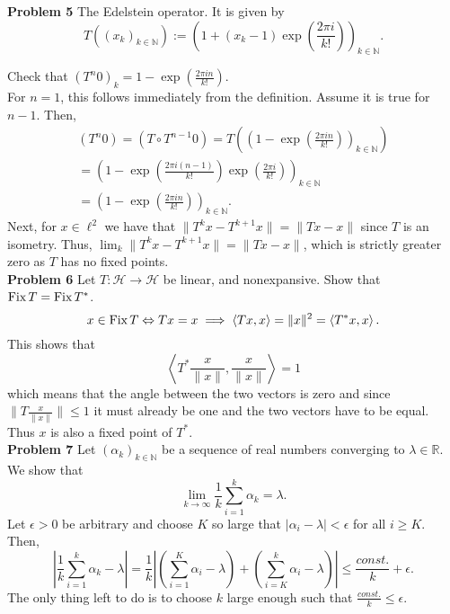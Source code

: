 \documentclass{scrartcl}
\newcommand{\N}{\mathbb{N}}
\newcommand{\R}{\mathbb{R}}
\renewcommand{\H}{\mathcal{H}}
\theoremstyle{plain}
\theoremstyle{remark}
\newcommand{\Fix}{\textup{Fix}\,}
\begin{document}
\textbf{Problem 5} The Edelstein operator.
It is given by 
\begin{equation}
  T\left({(x_{k})}_{k \in \N}\right) := {\left( 1 + (x_{k} - 1)\exp \left(\frac{2 \pi i}{k!}\right)\right)}_{k \in \N}.
\end{equation}

Check that ${(T^{n}0)}_{k} = 1 - \exp \left(\frac{2 \pi i n}{k!}\right)$.\\

For $n=1$, this follows immediately from the definition.
Assume it is true for $n-1$. Then,
\begin{equation}
  \begin{aligned}
    {(T^{n}0)} = {(T \circ T^{n-1}0)} = T \left( {\left(1 - \exp \left(\frac{2 \pi i n}{k!}\right)\right)}_{k \in \N} \right) \\
    = {\left( 1 - \exp\left(\frac{2 \pi i (n-1)}{k!}\right)\exp \left(\frac{2 \pi i}{k!}\right)\right)}_{k \in \N} \\
    = {\left( 1 - \exp \left(\frac{2 \pi i n }{k!}\right)\right)}_{k \in \N}.
  \end{aligned}
\end{equation}
Next, for $x \in \ell^2$ we have that $\lVert T^{k}x - T^{k+1}x \rVert = \lVert Tx - x \rVert$ since $T$ is an isometry.
Thus, $\lim_{k} \lVert T^{k}x - T^{k+1}x \rVert = \lVert Tx - x \rVert$, which is strictly greater zero as $T$ has no fixed points.\\


\textbf{Problem 6} Let $T: \H \to \H$ be linear, and nonexpansive. Show that $\Fix T = \Fix T^*$.
\begin{equation}
  x \in \Fix T \Leftrightarrow Tx=x \implies \left\langle Tx, x \right\rangle = \lVert x \rVert^2 = \left\langle T^*x, x \right\rangle.
\end{equation}
This shows that 
\begin{equation}
  \left\langle T^*\frac{x}{\lVert x \rVert}, \frac{x}{\lVert x \rVert} \right\rangle = 1
\end{equation}
which means that the angle between the two vectors is zero and since $\lVert T \frac{x}{\lVert x \rVert} \rVert \le 1$ it must already be one and the two vectors have to be equal. Thus $x$ is also a fixed point of $T^*$.\\

\textbf{Problem 7} Let ${(\alpha_{k})}_{k \in \N}$ be a sequence of real numbers converging to $\lambda \in \R$. We show that
\begin{equation}
  \lim_{k \to \infty} \frac{1}{k} \sum_{i=1}^{k} \alpha_{k} = \lambda.
\end{equation}
Let $\epsilon>0$ be arbitrary and choose $K$ so large that $\lvert \alpha_{i} - \lambda \rvert < \epsilon$ for all $i\ge K$. Then,
\begin{equation}
  \left\lvert \frac{1}{k} \sum_{i=1}^{k} \alpha_{k} - \lambda \right\rvert = \frac{1}{k} \left\lvert \left(\sum_{i=1}^{K} \alpha_{i} - \lambda\right) + \left( \sum_{i=K}^{k} \alpha_{i} - \lambda \right) \right\rvert \le \frac{const.}{k} + \epsilon.
\end{equation}
The only thing left to do is to choose $k$ large enough such that $\frac{const.}{k} \le \epsilon$.\\
\end{document}
